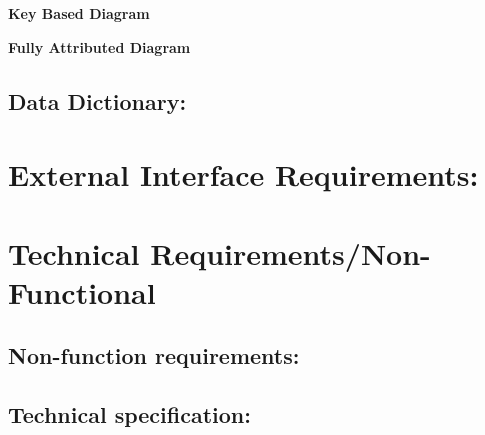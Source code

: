 \documentclass[12pt]{article}
\begin{document}
		\vspace{0.1in}

			\begin{center}
			\textbf{Key Based Diagram}
			\end{center}
		
		\vspace{0.3in}
		
		
		\begin{center}
			\textbf{Fully Attributed Diagram}
			\end{center}
		
		\vspace{0.3in}
		
		

		
	\vspace{0.1in}
	
		\subsection{Data Dictionary:}
		\vspace{0.1in}
		
		
	\vspace{0.5in}
	
	\section{External Interface Requirements:}
	\vspace{0.2in}
	
	
	
	\vspace{0.5in}
	
	\section{Technical Requirements/Non-Functional}
	\vspace{0.2in}
	
		\subsection{Non-function requirements:}
		\vspace{0.1in}
				
		\subsection{Technical specification:}
		\vspace{0.1in}
	
	\vspace{0.5in}
	
\end{document}
